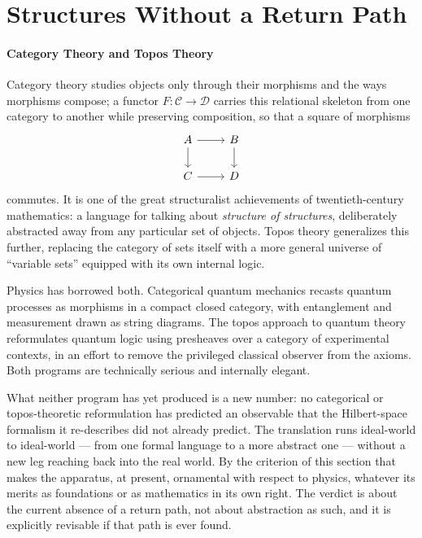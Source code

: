 \section{Structures Without a Return Path}
\label{sec:rm-nrp}
\paragraph{Category Theory and Topos Theory }
Category theory studies objects only through their morphisms and the ways
morphisms compose; a functor $F: \mathcal{C} \to \mathcal{D}$ carries this
relational skeleton from one category to another while preserving composition,
so that a square of morphisms
\[
\begin{tikzcd}
A \arrow[r, ] \arrow[d, '] & B \arrow[d, ] \\
C \arrow[r, '] & D
\end{tikzcd}
\]
commutes. It is one of the great
structuralist achievements of twentieth-century mathematics: a language for
talking about \emph{structure of structures}, deliberately abstracted away from
any particular set of objects. Topos theory generalizes this further, replacing
the category of sets itself with a more general universe of ``variable sets''
equipped with its own internal logic.

Physics has borrowed both. Categorical quantum mechanics recasts quantum
processes as morphisms in a compact closed category, with entanglement and
measurement drawn as string diagrams. The topos approach to quantum theory
reformulates quantum logic using presheaves over a category of experimental
contexts, in an effort to remove the privileged classical observer from the
axioms. Both programs are technically serious and internally elegant.

What neither program has yet produced is a new number: no categorical or
topos-theoretic reformulation has predicted an observable that the
Hilbert-space formalism it re-describes did not already predict. The
translation runs ideal-world to ideal-world --- from one formal language to a
more abstract one --- without a new leg reaching back into the real world. By
the criterion of this section that makes the apparatus, at present, ornamental
with respect to physics, whatever its merits as foundations or as mathematics
in its own right. The verdict is about the current absence of a return path,
not about abstraction as such, and it is explicitly revisable if that path is
ever found.

